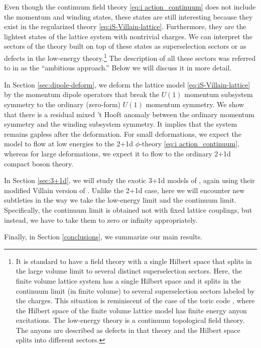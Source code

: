 \documentclass[12pt]{article}
\numberwithin{equation}{section}
\begin{document}
Even though the continuum field theory \eqref{eq:i action_continuum} does not include the momentum and winding states, these states are still interesting because they exist in the regularized theory \eqref{eq:iS-Villain-lattice}.  Furthermore, they are the lightest states of the lattice system with nontrivial charges.  We can interpret the sectors of the theory built on top of these states as superselection sectors or as defects in the low-energy theory.\footnote{It is standard to have a field theory with a single Hilbert space that splits in the large volume limit to several distinct superselection sectors.  Here, the finite volume lattice system has a single Hilbert space and it splits in the continuum limit (in finite volume) to several superselection sectors labeled by the charges.  This situation is reminiscent of the case of the toric code \cite{Kitaev:1997wr}, where the Hilbert space of the finite volume lattice model has finite energy anyon excitations.   The low-energy theory is a continuum topological field theory.  The anyons are described as defects in that theory and the Hilbert space splits into different sectors.} The description of all these sectors was referred to in \cite{paper1} as the ``ambitious approach.''  Below we will discuss it in more detail.

In Section \ref{sec:dipole-deform}, we deform the lattice model \eqref{eq:iS-Villain-lattice} by the momentum dipole operators that break the $U(1)$ momentum subsystem symmetry to the ordinary (zero-form) $U(1)$ momentum symmetry. We show that there is a residual mixed 't Hooft anomaly between the ordinary momentum symmetry and the winding subsystem symmetry. It implies that the system remains gapless after the deformation. For small deformations, we expect the model to flow at low energies to the 2+1d $\phi$-theory \eqref{eq:i action_continuum}, whereas for large deformations, we expect it to flow to the ordinary 2+1d compact boson theory.

In Section \ref{sec:3+1d}, we will study the exotic 3+1d models of \cite{paper2}, again using their modified Villain version of \cite{Gorantla:2021svj}.  Unlike the 2+1d case, here we will encounter new subtleties in the way we take the low-energy limit and the continuum limit.
Specifically, the continuum limit is obtained not with fixed lattice couplings, but instead, we have to take them to zero or infinity appropriately.

Finally, in Section \ref{conclusions}, we summarize our main results.
\end{document}
